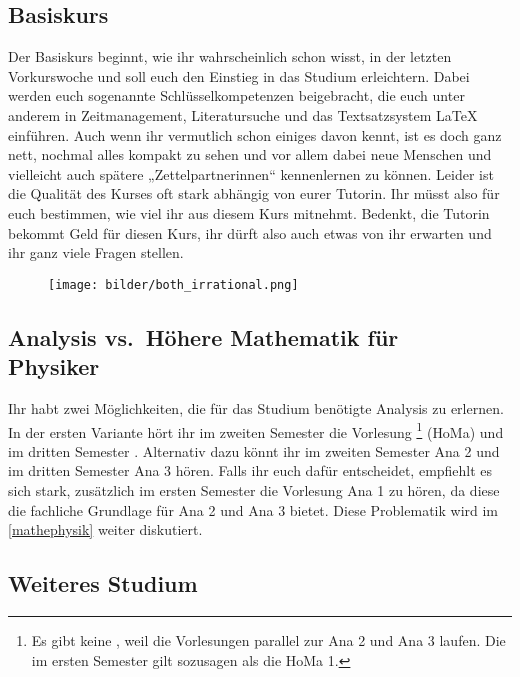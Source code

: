 \subsection{Basiskurs}
Der Basiskurs beginnt, wie ihr wahrscheinlich schon wisst, in der letzten Vorkurswoche und soll euch den Einstieg in das Studium erleichtern. Dabei werden euch sogenannte Schlüsselkompetenzen beigebracht, die euch unter anderem in Zeitmanagement, Literatursuche und das Textsatzsystem \LaTeX{} einführen. Auch wenn ihr vermutlich schon einiges davon kennt, ist es doch ganz nett, nochmal alles kompakt zu sehen und vor allem dabei neue Menschen und vielleicht auch spätere „Zettelpartnerinnen“ kennenlernen zu können. Leider ist die Qualität des Kurses oft stark abhängig von eurer Tutorin. Ihr müsst also für euch bestimmen, wie viel ihr aus diesem Kurs mitnehmt. Bedenkt, die Tutorin bekommt Geld für diesen Kurs, ihr dürft also auch etwas von ihr erwarten und ihr ganz viele Fragen stellen.

\begin{figure}[b]
	\centering
	\texttt{[image: bilder/both\_irrational.png]}
\end{figure}


\subsection{Analysis vs.~Höhere Mathematik für \\Physiker}
Ihr habt zwei Möglichkeiten, die für das Studium benötigte Analysis zu erlernen.
In der ersten Variante hört ihr im zweiten Semester die Vorlesung \footnote{Es gibt keine , weil die Vorlesungen parallel zur \gls{Ana} 2 und \gls{Ana} 3 laufen. Die  im ersten Semester gilt sozusagen als die \gls{HoMa} 1.} (\gls{HoMa}) und im dritten Semester . Alternativ dazu könnt ihr im zweiten Semester \gls{Ana} 2 und im dritten Semester \gls{Ana} 3 hören. Falls ihr euch dafür entscheidet, empfiehlt es sich stark, zusätzlich im ersten Semester die Vorlesung \gls{Ana} 1 zu hören, da diese die fachliche Grundlage für \gls{Ana} 2 und \gls{Ana} 3 bietet. Diese Problematik wird im \autoref{mathephysik} weiter diskutiert.

\subsection{Weiteres Studium}


